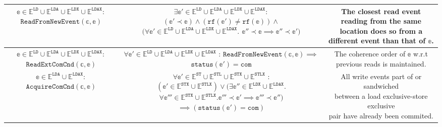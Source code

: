 \documentclass{article}
\newcommand{\var}{\texttt}
\begin{document}
\begin{center}
\begin{longtable}{||c | c | c||}
 \hline
 \makecell{$\mathbb{e} \in \mathbb{E}^\var{LD} \cup \mathbb{E}^\var{LDA} \cup \mathbb{E}^\var{LDX} \cup \mathbb{E}^\var{LDAX}:$\\$\var{ReadFromNewEvent}(\mathbb{c},\mathbb{e})$} & \makecell{$\exists \mathbb{e}' \in \mathbb{E}^\var{LD} \cup \mathbb{E}^\var{LDA} \cup \mathbb{E}^\var{LDX} \cup \mathbb{E}^\var{LDAX}:$\\$(\mathbb{e}' \prec \mathbb{e}) \wedge (\var{rf}(\mathbb{e}') \neq \var{rf}(\mathbb{e})) \wedge$\\$(\forall \mathbb{e}' \in  \mathbb{E}^\var{LD} \cup \mathbb{E}^\var{LDA} \cup \mathbb{E}^\var{LDX} \cup \mathbb{E}^\var{LDAX}.$\\$\mathbb{e}'' \prec \mathbb{e} \implies \mathbb{e}'' \prec \mathbb{e}')$} & \makecell{The closest read event reading from\\ the same location does so from\\ a different event than that of $\mathbb{e}$.}\\
 \hline
 \makecell{$\mathbb{e} \in \mathbb{E}^\var{LD} \cup \mathbb{E}^\var{LDA} \cup \mathbb{E}^\var{LDX} \cup \mathbb{E}^\var{LDAX}:$\\$\var{ReadExtComCnd}(\mathbb{c},\mathbb{e})$} & \makecell{$\forall \mathbb{e}' \in \mathbb{E}^\var{LD} \cup \mathbb{E}^\var{LDA} \cup \mathbb{E}^\var{LDX} \cup \mathbb{E}^\var{LDAX}$ :\\$\var{ReadFromNewEvent}(\mathbb{c},\mathbb{e}) \implies$ \\ $\texttt{status}(\mathbb{e}') = \texttt{com}$} & \makecell{The coherence order of $\mathbb{e}$ w.r.t\\ previous reads is maintained.}\\
 \hline
 \makecell{$\mathbb{e} \in \mathbb{E}^\var{LDA} \cup \mathbb{E}^\var{LDAX}:$\\$\var{AcquireComCnd}(\mathbb{c},\mathbb{e})$} & \makecell{$\forall \mathbb{e}' \in \mathbb{E}^\var{ST} \cup \mathbb{E}^\var{STL} \cup \mathbb{E}^\var{STX} \cup \mathbb{E}^\var{STLX}$ :\\$(\mathbb{e}' \in \mathbb{E}^\var{STX} \cup \mathbb{E}^\var{STLX}) \vee (\exists \mathbb{e}'' \in \mathbb{E}^\var{LDX} \cup \mathbb{E}^\var{LDAX}.$\\$\forall \mathbb{e}''' \in \mathbb{E}^\var{STX} \cup \mathbb{E}^\var{STLX}. \mathbb{e}''' \prec \mathbb{e}' \implies \mathbb{e}''' \prec \mathbb{e}'')$\\$\implies (\texttt{status}(\mathbb{e}') = \texttt{com})$} & \makecell{All write events part of or sandwiched\\ between a load exclusive-store exclusive\\ pair have already been commited.}\\

\end{longtable}
\end{center}
\end{document}
